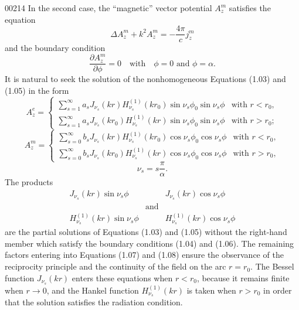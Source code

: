 \begin{scanpage}{0021}{4}
In the second case, the ``magnetic'' vector potential $A_z^m$ satisfies the equation
\[\Delta A_z^m+k^2A_z^m=-\frac{4\pi}{c}j_z^m\tag{1.05}\]
and the boundary condition
\[\frac{\partial A_z^m}{\partial\phi}=0\quad\text{with}\quad\phi=0\text{ and }\phi=\alpha.\tag{1.06}\]
It is natural to seek the solution of the nonhomogeneous Equations (1.03) and (1.05) in the form
\[A_z^e=\begin{cases}\displaystyle\sum_{s=1}^{\infty}a_sJ_{\nu_s}(kr)H_{\nu_s}^{(1)}(kr_0)\sin\nu_s\phi_0\sin\nu_s\phi&\text{with }r<r_0,\\\displaystyle\sum_{s=1}^{\infty}a_sJ_{\nu_s}(kr_0)H_{\nu_s}^{(1)}(kr)\sin\nu_s\phi_0\sin\nu_s\phi&\text{with }r>r_0;\end{cases}\tag{1.07}\]
\[A_z^m=\begin{cases}\displaystyle\sum_{s=0}^{\infty}b_sJ_{\nu_s}(kr)H_{\nu_s}^{(1)}(kr_0)\cos\nu_s\phi_0\cos\nu_s\phi&\text{with }r<r_0,\\\displaystyle\sum_{s=0}^{\infty}b_sJ_{\nu_s}(kr_0)H_{\nu_s}^{(1)}(kr)\cos\nu_s\phi_0\cos\nu_s\phi&\text{with }r>r_0,\end{cases}\tag{1.08}\]
\[\nu_s=s\frac{\pi}{\alpha}.\]
The products
\[\begin{array}{ccc}J_{\nu_s}(kr)\sin\nu_s\phi&&J_{\nu_s}(kr)\cos\nu_s\phi\\&\text{and}&\\H_{\nu_s}^{(1)}(kr)\sin\nu_s\phi&&H_{\nu_s}^{(1)}(kr)\cos\nu_s\phi\end{array}\tag{1.09}\]
are the partial solutions of Equations (1.03) and (1.05) without the right-hand member which satisfy the boundary conditions (1.04) and (1.06). The remaining factors entering into Equations (1.07) and (1.08) ensure the observance of the reciprocity principle and the continuity of the field on the arc $r=r_0$. The Bessel function $J_{\nu_s}(kr)$ enters these equations when $r<r_0$, because it remains finite when $r\to0$, and the Hankel function $H_{\nu_s}^{(1)}(kr)$ is taken when $r>r_0$ in order that the solution satisfies the radiation condition.
\end{scanpage}
